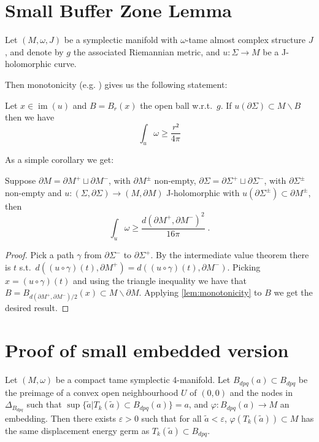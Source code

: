 \documentclass[12pt,a4paper,draft]{scrartcl}
\DeclareMathOperator{\im}{im}
\begin{document}
\section{Small Buffer Zone Lemma}

Let $(M,ω,J)$ be a symplectic manifold with $ω$-tame almost complex structure $J$, and denote by $g$ the associated Riemannian metric, and $u\colon Σ → M$ be a J-holomorphic curve.

Then monotonicity (e.g. \cite[Proposition 4.3.1 (ii)]{sikorav1994}) gives us the following statement:

\begin{lemma}[Monotonicity]
  \label{lem:monotonicity}
  Let $x ∈ \im(u)$ and $B = B_r(x)$ the open ball w.r.t.\ $g$. If $u(∂Σ) ⊂ M ∖ B$ then we have
  \[∫_u ω ≥ \frac{r²}{4π}\]
\end{lemma}

As a simple corollary we get:

\begin{corollary}
  \label{cor:small_buffer}
  Suppose $∂M = ∂M^+ ⊔ ∂M^-$, with $∂M^±$ non-empty, $∂Σ = ∂Σ^+ ⊔ ∂Σ^-$, with $∂Σ^±$ non-empty and $u\colon (Σ,∂Σ) → (M,∂M)$ J-holomorphic with $u(∂Σ^±) ⊂ ∂M^±$, then
  \[∫_u ω ≥ \frac{d(∂M^+,∂M^-)^2}{16π} \; .\]
\end{corollary}

\begin{proof}
  Pick a path $γ$ from $∂Σ^-$ to $∂Σ^+$. By the intermediate value theorem there is $t$ s.t.\ $d((u ∘ γ) (t),∂M^+) = d((u ∘ γ)(t), ∂M^-)$. Picking $x = (u ∘ γ)(t)$ and using the triangle inequality we have that $B = B_{d(∂M^+,∂M^-)/2}(x) ⊂ M ∖ ∂M $. Applying \cref{lem:monotonicity} to $B$ we get the desired result.
\end{proof}

\section{Proof of small embedded version}


\begin{theorem}
  Let $(M,ω)$ be a compact tame symplectic 4-manifold. Let $B_{dpq}(a) ⊂ B_{dpq}$ be the preimage of a convex open neighbourhood $U$ of $(0,0)$ and the nodes in $Δ_{B_{dpq}}$ such that $\sup\{\tilde{a} | T_k(\tilde{a}) ⊂ B_{dpq}(a)\} = a$, and $φ \colon B_{dpq}(a) → M$ an embedding. Then there exists $ε>0$ such that for all $\tilde{a}<ε$, $φ(T_k(\tilde{a})) ⊂ M$ has the same displacement energy germ as $T_k(\tilde{a}) ⊂ B_{dpq}$.
\end{theorem}
\end{document}
